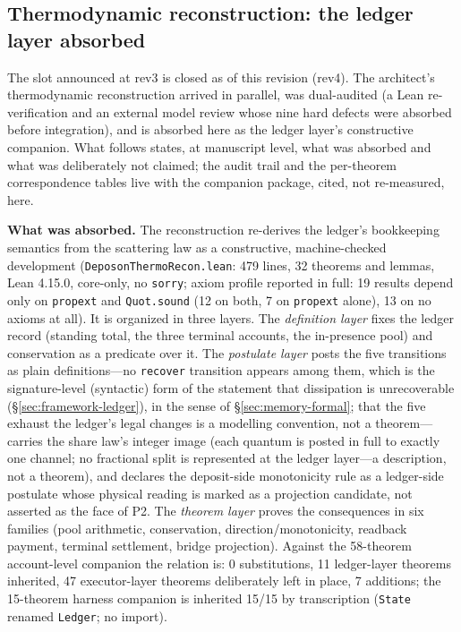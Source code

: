 \documentclass[11pt,a4paper]{article}
\begin{document}
\subsection{Thermodynamic reconstruction: the ledger layer absorbed}
\label{sec:absorption}

The slot announced at rev3 is closed as of this revision (rev4). The architect's thermodynamic reconstruction arrived in parallel, was dual-audited (a Lean re-verification and an external model review whose nine hard defects were absorbed before integration), and is absorbed here as the ledger layer's constructive companion. What follows states, at manuscript level, what was absorbed and what was deliberately not claimed; the audit trail and the per-theorem correspondence tables live with the companion package, cited, not re-measured, here.

\textbf{What was absorbed.} The reconstruction re-derives the ledger's bookkeeping semantics from the scattering law as a constructive, machine-checked development (\texttt{DeposonThermoRecon.lean}: 479 lines, 32 theorems and lemmas, Lean 4.15.0, core-only, no \texttt{sorry}; axiom profile reported in full: 19 results depend only on \texttt{propext} and \texttt{Quot.sound} (12 on both, 7 on \texttt{propext} alone), 13 on no axioms at all). It is organized in three layers. The \emph{definition layer} fixes the ledger record (standing total, the three terminal accounts, the in-presence pool) and conservation as a predicate over it. The \emph{postulate layer} posts the five transitions as plain definitions---no \texttt{recover} transition appears among them, which is the signature-level (syntactic) form of the statement that dissipation is unrecoverable (\S\ref{sec:framework-ledger}), in the sense of \S\ref{sec:memory-formal}; that the five exhaust the ledger's legal changes is a modelling convention, not a theorem---carries the share law's integer image (each quantum is posted in full to exactly one channel; no fractional split is represented at the ledger layer---a description, not a theorem), and declares the deposit-side monotonicity rule as a ledger-side postulate whose physical reading is marked as a projection candidate, not asserted as the face of P2. The \emph{theorem layer} proves the consequences in six families (pool arithmetic, conservation, direction/monotonicity, readback payment, terminal settlement, bridge projection). Against the 58-theorem account-level companion the relation is: 0 substitutions, 11 ledger-layer theorems inherited, 47 executor-layer theorems deliberately left in place, 7 additions; the 15-theorem harness companion is inherited 15/15 by transcription (\texttt{State} renamed \texttt{Ledger}; no import).
\end{document}
